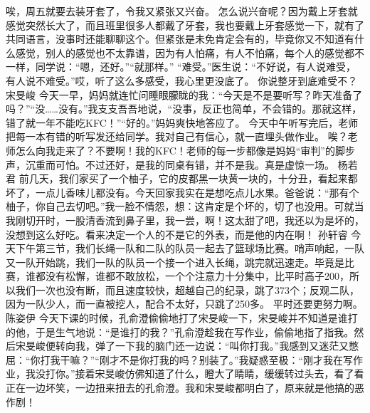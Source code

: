 {}唉，周五就要去装牙套了，令我又紧张又兴奋。\markdownRendererInterblockSeparator
{}怎么说兴奋呢？因为戴上牙套就感觉突然长大了，而且班里很多人都戴了牙套，我也要戴上牙套感觉一下，就有了共同语言，没事时还能聊聊这个。但紧张是未免肯定会有的，毕竟你又不知道有什么感觉，别人的感觉也不太靠谱，因为有人怕痛，有人不怕痛，每个人的感觉都不一样，同学说：“嗯，还好。”“就那样。”\markdownRendererInterblockSeparator
{}“难受。”医生说：“不好说，有人说难受，有人说不难受。”哎，听了这么多感受，我心里更没底了。\markdownRendererInterblockSeparator
{}你说整牙到底难受不？\markdownRendererInterblockSeparator
{}\markdownRendererInterblockSeparator
{}宋旻峻\markdownRendererInterblockSeparator
{}今天一早，妈妈就连忙问睡眼朦眬的我：“今天是不是要听写？昨天准备了吗？”“没……没有。”我支支吾吾地说，“没事，反正也简单，不会错的。那就这样，错了就一年不能吃KFC！”“好的。”妈妈爽快地答应了。 \markdownRendererInterblockSeparator
{}今天中午听写完后，老师把每一本有错的听写发还给同学。我对自己有信心，就一直埋头做作业。 唉？老师怎么向我走来了？不要啊！我的KFC！老师的每一步都像是妈妈“审判”的脚步声，沉重而可怕。不过还好，是我的同桌有错，并不是我。真是虚惊一场。\markdownRendererInterblockSeparator
{}\markdownRendererInterblockSeparator
{}杨若君\markdownRendererInterblockSeparator
{}前几天，我们家买了一个柚子，它的皮都黑一块黄一块的，十分丑，看起来都坏了，一点儿香味儿都没有。今天回家我实在是想吃点儿水果。爸爸说：“那有个柚子，你自己去切吧。”我一脸不情怨，想：这肯定是个坏的，切了也没用。可就当我刚切开时，一股清香流到鼻子里，我一尝，啊！这太甜了吧，我还以为是坏的，没想到这么好吃。看来决定一个人的不是它的外表，而是他的内在啊！\markdownRendererInterblockSeparator
{}\markdownRendererInterblockSeparator
{}孙轩睿\markdownRendererInterblockSeparator
{}今天下午第三节，我们长绳一队和二队的队员一起去了篮球场比赛。哨声响起，一队又一队开始跳，我们一队的队员一个接一个进入长绳，跳完就迅速走。毕竟是比赛，谁都没有松懈，谁都不敢放松，一个个注意力十分集中，比平时高子200\markdownRendererPercentSign{}，所以我们一次也没有断，而且速度较快，超越自己的纪录，跳了373个；反观二队，因为一队少人，而一直被挖人，配合不太好，只跳了250多。\markdownRendererInterblockSeparator
{}平时还要更努力啊。\markdownRendererInterblockSeparator
{}\markdownRendererInterblockSeparator
{}陈姿伊\markdownRendererInterblockSeparator
{}今天下课的时候，孔俞澄偷偷地打了宋旻峻一下，宋旻峻并不知道是谁打的他，于是生气地说：“是谁打的我？”孔俞澄趁我在写作业，偷偷地指了指我。然后宋旻峻便转向我，弹了一下我的脑门还一边说：“叫你打我。”我感到又迷茫又憋屈：“你打我干嘛？”“刚才不是你打我的吗？别装了。”我疑惑至极：“刚才我在写作业，我没打你。”接着宋旻峻仿佛知道了什么，瞪大了睛睛，缓缓转过头去，看了看正在一边坏笑，一边扭来扭去的孔俞澄。我和宋旻峻都明白了，原来就是他搞的恶作剧！\markdownRendererInterblockSeparator
